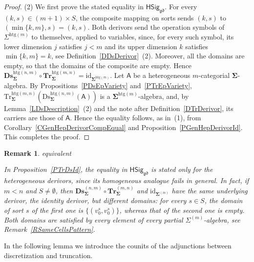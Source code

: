 \documentclass[a4paper, reqno]{amsbook}
\makeatletter
\newcommand{\sig}[1]{\mathbf{#1}}             %
\newcommand{\calg}[1]{\boldsymbol{\mathsf{#1}}} %
\newcommand{\gd}{\mathfrak{gd}}              %
\newcommand{\htg}{\mathrm{htg}}                %
\newcommand{\id}{\mathrm{id}}
\newcommand{\Ds}{\mathrm{Ds}}
\newcommand{\Tr}{\mathrm{Tr}}
\newcommand{\bDs}{\mathbf{Ds}}
\newcommand{\bTr}{\mathbf{Tr}}
\theoremstyle{plain}
\newtheorem{remark}[theorem]{Remark}
\theoremstyle{definition}
\newcommand*{\CA@leanpending}{}
\newcommand*{\CA@leanrelation}{}
\newcommand*{\lean}[2]{%
  \ifcsname\string\color@lean@#1\endcsname\else
    \PackageError{main}{Unknown relation `#1' in \string\lean}{Use equivalent, weaker or stronger.}%
  \fi
  \gdef\CA@leanrelation{#1}%
  \gdef\CA@leanpending{#2}}
\makeatother
\begin{document}
\begin{proof}
(2) We first prove the stated equality in $\mathsf{HSig}_{\gd}$.
For every $(k,s)\in(m+1)\times S$, the composite mapping on sorts sends $(k,s)$ to $(\min\{k,m\},s)=(k,s)$.
Both derivors send the operation symbols of $\Sigma^{\htg(m)}$ to themselves, applied to variables, since, for every such symbol, its lower dimension $j$ satisfies $j<m$ and its upper dimension $k$ satisfies $\min\{k,m\}=k$, see Definition~\ref{DDsDerivor}~(2).
Moreover, all the domains are empty, so that the domains of the composite are empty.
Hence $\bDs^{\htg(n,m)}_{\sig{\Sigma}}\circ\bTr^{\htg(m,n)}_{\sig{\Sigma}}=\id_{\sig{\Sigma}^{\htg(m)}}$.
Let $\calg{A}$ be a heterogeneous $m$-categorial $\sig{\Sigma}$-algebra.
By Propositions~\ref{PDsEpVariety} and~\ref{PTrEpVariety}, $\Tr^{\htg(m,n)}_{\sig{\Sigma}}(\Ds^{\htg(n,m)}_{\sig{\Sigma}}(\calg{A}))$ is a $\sig{\Sigma}^{\htg(m)}$-algebra, and, by Lemma~\ref{LDsDescription}~(2) and the note after Definition~\ref{DTrDerivor}, its carriers are those of $\calg{A}$.
Hence the equality follows, as in~(1), from Corollary~\ref{CGenHepDerivorCompEqual} and Proposition~\ref{PGenHepDerivorId}. This completes the proof.
\end{proof}

\begin{remark}\label{RTrDsIdHomogeneous}\lean{equivalent}{Dimensions.homogeneousTruncation_discretization_derivor,Dimensions.homogeneousTruncation_discretization_ne}
In Proposition~\ref{PTrDsId}, the equality in $\mathsf{HSig}_{\gd}$ is stated only for the heterogeneous derivors, since its homogeneous analogue fails in general.
In fact, if $m<n$ and $S\neq\emptyset$, then $\bDs^{(n,m)}_{\sig{\Sigma}}\circ\bTr^{(m,n)}_{\sig{\Sigma}}$ and $\id_{\sig{\Sigma}^{(m)}}$ have the same underlying derivor, the identity derivor, but different domains: for every $s\in S$, the domain of sort $s$ of the first one is $\{(v^s_0,v^s_0)\}$, whereas that of the second one is empty.
Both domains are satisfied by every element of every partial $\Sigma^{(m)}$-algebra, see Remark~\ref{RSameCellsPattern}.
\end{remark}

In the following lemma we introduce the counits of the adjunctions between discretization and truncation.
\end{document}
